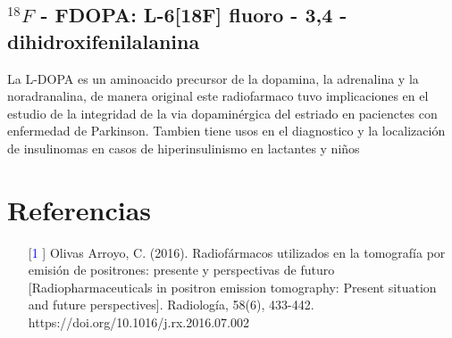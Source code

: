 \documentclass{article}
\begin{document}
\subsection{${}^{18} F$ - FDOPA: L-6[18F] fluoro - 3,4 - dihidroxifenilalanina}

La L-DOPA es un aminoacido precursor de la dopamina, la adrenalina y la noradranalina, de manera original este radiofarmaco tuvo implicaciones en el estudio de la integridad de la via dopaminérgica del estriado en pacienctes con enfermedad de Parkinson. Tambien tiene usos en el diagnostico y la localización de insulinomas en casos de hiperinsulinismo en lactantes y niños


\section*{Referencias}

\begin{enumerate}
    \item [[\textcolor{blue}{1}]] Olivas Arroyo, C. (2016). Radiofármacos utilizados en la tomografía por emisión de positrones: presente y perspectivas de futuro [Radiopharmaceuticals in positron emission tomography: Present situation and future perspectives]. Radiología, 58(6), 433-442. https://doi.org/10.1016/j.rx.2016.07.002
    
\end{enumerate}
\end{document}
